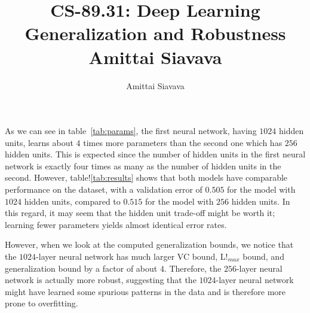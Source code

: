 \documentclass[11pt, reqno]{amsart}
\begin{document}

\title{CS-89.31: Deep Learning Generalization and Robustness\\ Amittai Siavava \\ }
\author{Amittai Siavava}


\setlength{\headheight}{13.0pt}
\setlength{\footskip}{15.0pt}

\maketitle

\bigskip

\def \cram { \textsc{cram} }
\def \dom { \textsc{domineering} }
\def \sub { \textsc{subtraction} }
\def \weighted { \textsc{weighted odds and evens}}
\def \nim { \textsc{nim} }
\def \P { \mathbf{P}}
\def \N { \mathbf{N}}


  As we can see in table~\ref{tab:params}, the first neural network,
  having $1024$ hidden units, learns about $4$ times more parameters
  than the second one which has $256$ hidden units.
  This is expected since the number of hidden units in the first neural
  network is exactly four times as many as the number of hidden units in the second.
  However, table!\ref{tab:results} shows that both models have comparable performance
  on the dataset, with a validation error of $0.505$ for the model with $1024$ hidden units,
  compared to $0.515$ for the model with $256$ hidden units.
  In this regard, it may seem that the hidden unit trade-off might be worth it;
  learning fewer parameters yields almost identical error rates.

  \step
  However, when we look at the computed generalization bounds,
  we notice that the $1024$-layer neural network has much larger VC bound,
  L!$_{max}$ bound, and generalization bound by a factor of about $4$.
  Therefore, the $256$-layer neural network is actually more robust,
  suggesting that the $1024$-layer neural network might have learned
  some spurious patterns in the data and is therefore more prone to overfitting.
\end{document}

